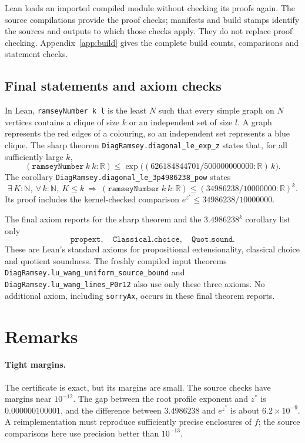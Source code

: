 \documentclass[11pt]{article}
\theoremstyle{definition}
\theoremstyle{remark}
\newcommand{\R}{\mathbb{R}}
\newcommand{\N}{\mathbb{N}}
\newcommand{\lean}[1]{\nolinkurl{#1}}
\begin{document}
Lean loads an imported compiled module without checking its proofs again.
The source compilations provide the proof checks; manifests and build stamps identify the sources and outputs
to which those checks apply. They do not replace proof checking.
Appendix~\ref{app:build} gives the complete build counts, comparisons and statement checks.

\subsection{Final statements and axiom checks}

In Lean, \lean{ramseyNumber k l} is the least $N$ such that every simple graph on $N$ vertices
contains a clique of size $k$ or an independent set of size $l$. A graph represents the red edges of a
colouring, so an independent set represents a blue clique.
The sharp theorem \lean{DiagRamsey.diagonal_le_exp_z} states that, for all sufficiently large $k$,
\[
(\texttt{ramseyNumber}\ k\ k:\R)
\le \exp\bigl((626184844701/500000000000:\R)\,k\bigr).
\]
The corollary \lean{DiagRamsey.diagonal_le_3p4986238_pow} states
\[
\exists\,K:\N,\ \forall\,k:\N,\ K\le k\ \Longrightarrow\
(\texttt{ramseyNumber}\ k\ k:\R)\le(34986238/10000000:\R)^k.
\]
Its proof includes the kernel-checked comparison $e^{z^*}\le34986238/10000000$.

The final axiom reports for the sharp theorem and the $3.4986238^k$ corollary list only
\[
\texttt{propext},\quad \texttt{Classical.choice},\quad \texttt{Quot.sound}.
\]
These are Lean's standard axioms for propositional extensionality, classical choice and quotient soundness.
The freshly compiled input theorems \lean{DiagRamsey.lu_wang_uniform_source_bound} and
\lean{DiagRamsey.lu_wang_lines_P0r12} also use only these three axioms.
No additional axiom, including \texttt{sorryAx}, occurs in these final theorem reports.

\section{Remarks}

\paragraph{Tight margins.} The certificate is exact, but its margins are small. The source checks have margins near
$10^{-12}$. The gap between the root profile exponent and $z^*$ is $0.000000100001$, and the difference
between $3.4986238$ and $e^{z^*}$ is about $6.2\times10^{-9}$.
A reimplementation must reproduce sufficiently precise enclosures of $f$; the source comparisons here use
precision better than $10^{-13}$.
\end{document}
